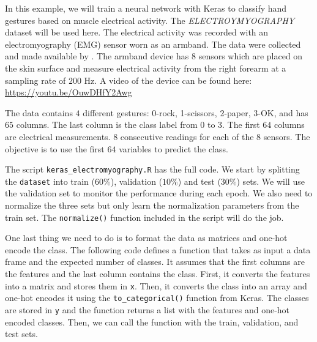\documentclass[
  11pt,
]{krantz}
\begin{document}
In this example, we will train a neural network with Keras to classify hand gestures based on muscle electrical activity. The \emph{ELECTROYMYOGRAPHY} dataset will be used here. The electrical activity was recorded with an electromyography (EMG) sensor worn as an armband. The data were collected and made available by \citet{kirill}. The armband device has \(8\) sensors which are placed on the skin surface and measure electrical activity from the right forearm at a sampling rate of \(200\) Hz. A video of the device can be found here: \url{https://youtu.be/OuwDHfY2Awg}

The data contains \(4\) different gestures: 0-rock, 1-scissors, 2-paper, 3-OK, and has \(65\) columns. The last column is the class label from \(0\) to \(3\). The first \(64\) columns are electrical measurements. \(8\) consecutive readings for each of the \(8\) sensors. The objective is to use the first \(64\) variables to predict the class.

The script \texttt{keras\_electromyography.R} has the full code. We start by splitting the \texttt{dataset} into train (\(60\%\)), validation (\(10\%\)) and test (\(30\%\)) sets. We will use the validation set to monitor the performance during each epoch. We also need to normalize the three sets but only learn the normalization parameters from the train set. The \texttt{normalize()} function included in the script will do the job.

One last thing we need to do is to format the data as matrices and one-hot encode the class. The following code defines a function that takes as input a data frame and the expected number of classes. It assumes that the first columns are the features and the last column contains the class. First, it converts the features into a matrix and stores them in \texttt{x}. Then, it converts the class into an array and one-hot encodes it using the \texttt{to\_categorical()} function from Keras. The classes are stored in \texttt{y} and the function returns a list with the features and one-hot encoded classes. Then, we can call the function with the train, validation, and test sets.
\end{document}
